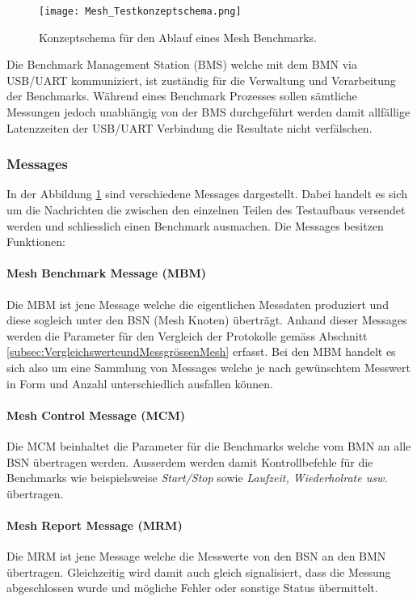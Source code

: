 \begin{figure}[h]
	\centering
	\texttt{[image: Mesh\_Testkonzeptschema.png]}
	\caption{Konzeptschema für den Ablauf eines Mesh Benchmarks.}\label{fig:MeshTestKonzept}
\end{figure}

Die Benchmark Management Station (BMS) welche mit dem BMN via USB/UART kommuniziert, ist zuständig für die Verwaltung und Verarbeitung der Benchmarks. Während eines Benchmark Prozesses sollen sämtliche Messungen jedoch unabhängig von der BMS durchgeführt werden damit allfällige Latenzzeiten der USB/UART Verbindung die Resultate nicht verfälschen.

\subsubsection{Messages}\label{subsubsec:Messages}
In der Abbildung \ref{fig:MeshTestKonzept} sind verschiedene Messages dargestellt. Dabei handelt es sich um die Nachrichten die zwischen den einzelnen Teilen des Testaufbaus versendet werden und schliesslich einen Benchmark ausmachen. Die Messages besitzen Funktionen:

\paragraph{Mesh Benchmark Message (MBM)}
Die MBM ist jene Message welche die eigentlichen Messdaten produziert und diese sogleich unter den BSN (Mesh Knoten) überträgt. Anhand dieser Messages werden die Parameter für den Vergleich der Protokolle gemäss Abschnitt \ref{subsec:VergleichswerteundMessgrössenMesh} erfasst. Bei den MBM handelt es sich also um eine Sammlung von Messages welche je nach gewünschtem Messwert in Form und Anzahl unterschiedlich ausfallen können.

\paragraph{Mesh Control Message (MCM)}
Die MCM beinhaltet die Parameter für die Benchmarks welche vom BMN an alle BSN übertragen werden. Ausserdem werden damit Kontrollbefehle für die Benchmarks wie beispielsweise \textit{Start/Stop} sowie \textit{Laufzeit, Wiederholrate usw.} übertragen.

\paragraph{Mesh Report Message (MRM)}
Die MRM ist jene Message welche die Messwerte von den BSN an den BMN übertragen. Gleichzeitig wird damit auch gleich signalisiert, dass die Messung abgeschlossen wurde und mögliche Fehler oder sonstige Status übermittelt.

